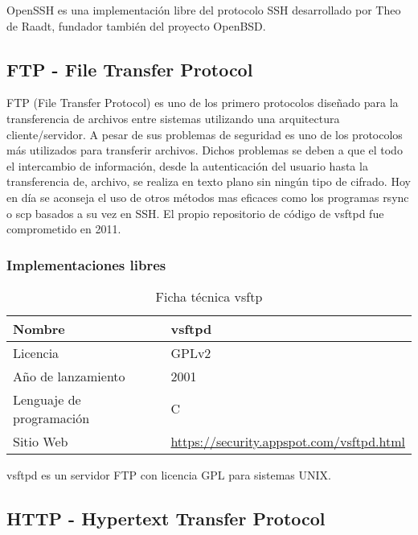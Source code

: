 OpenSSH es una implementación libre del protocolo SSH desarrollado por Theo de Raadt, fundador también del proyecto OpenBSD.

\subsection {FTP - File Transfer Protocol}

FTP (File Transfer Protocol) es uno de los primero protocolos diseñado para la transferencia de archivos entre sistemas utilizando una arquitectura cliente/servidor. A pesar de sus problemas de seguridad\cite{todd_why_2000} es uno de los protocolos más utilizados para transferir archivos. Dichos problemas se deben a que el todo el intercambio de información, desde la autenticación del usuario hasta la transferencia de, archivo, se realiza en texto plano sin ningún tipo de cifrado. Hoy en día se aconseja el uso de otros métodos mas eficaces como los programas rsync o scp basados a su vez en SSH. El propio repositorio de código de vsftpd fue comprometido en 2011\cite{hkcert_security_bulletin_sa11070501_2011}.

\subsubsection {Implementaciones libres}

\begin{table}[H]
\begin{tabular}{|l|l|}
\hline
Nombre                   & vsftpd                       \\ \hline
Licencia                 & GPLv2                        \\ \hline
Año de lanzamiento       & 2001                         \\ \hline
Lenguaje de programación & C                            \\ \hline
Sitio Web                & \url{https://security.appspot.com/vsftpd.html} \\ \hline
\end{tabular}
\caption{Ficha técnica vsftp}
\end{table}

vsftpd es un servidor FTP con licencia GPL para sistemas UNIX.

\subsection {HTTP - Hypertext Transfer Protocol}

